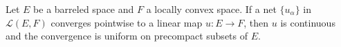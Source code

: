 Let $E$ be a barreled space and $F$ a locally convex space. If a net $\{u_\alpha\}$ in $\mathcal{L}(E, F)$ converges pointwise to a linear map $u: E \rightarrow F$, then $u$ is continuous and the convergence is uniform on precompact subsets of $E$.
